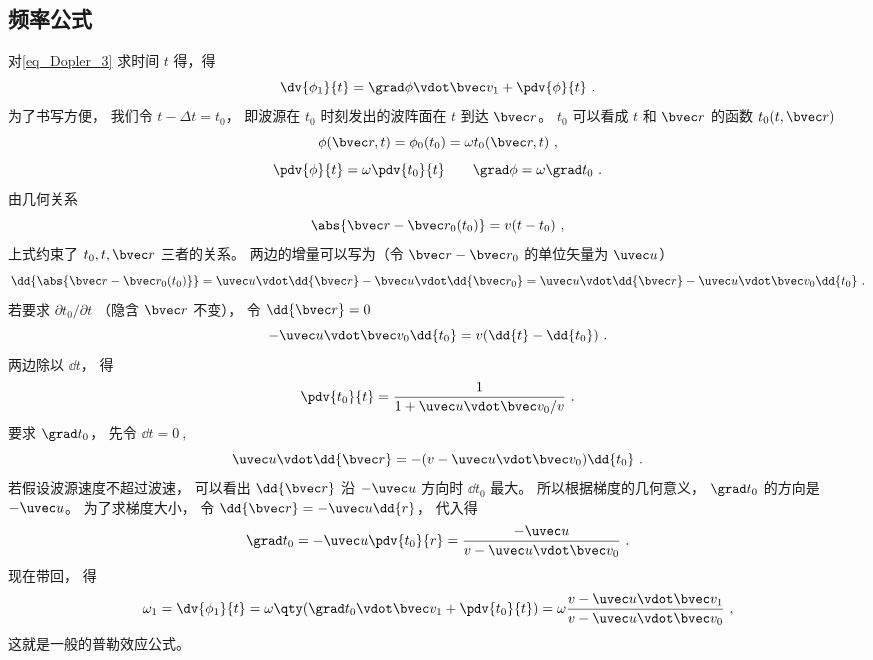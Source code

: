 \subsection{频率公式}
对\autoref{eq_Dopler_3} 求时间 $t$ 得，得
\begin{equation}
\dv{\phi_1}{t} = \grad\phi \vdot \bvec v_1 + \pdv{\phi}{t}~.
\end{equation}
为了书写方便， 我们令 $t - \Delta t = t_0$， 即波源在 $t_0$ 时刻发出的波阵面在 $t$ 到达 $\bvec r$。 $t_0$ 可以看成 $t$ 和 $\bvec r$ 的函数  $t_0(t, \bvec r)$
\begin{equation}
\phi(\bvec r, t) =  \phi_0(t_0) = \omega t_0(\bvec r, t)~,
\end{equation}
\begin{equation}
\pdv{\phi}{t} = \omega \pdv{t_0}{t} \qquad
\grad \phi = \omega \grad t_0~.
\end{equation}
由几何关系
\begin{equation}
\abs{\bvec r - \bvec r_0(t_0)} = v(t - t_0)~,
\end{equation}
上式约束了 $t_0, t, \bvec r$ 三者的关系。 两边的增量可以写为（令 $\bvec r - \bvec r_0$ 的单位矢量为 $\uvec u$）
\begin{equation}
\dd{\abs{\bvec r - \bvec r_0(t_0)}} = \uvec u \vdot \dd{\bvec r} - \bvec u \vdot \dd{\bvec r_0} = \uvec u \vdot \dd{\bvec r} - \uvec u \vdot \bvec v_0 \dd{t_0}~.
\end{equation}
若要求 $\partial t_0 / \partial t$ （隐含 $\bvec r$ 不变）， 令 $\dd{\bvec r} = 0$
\begin{equation}
-\uvec u \vdot \bvec v_0 \dd{t_0} = v(\dd{t} - \dd{t_0})~.
\end{equation}
两边除以 $\dd{t}$， 得
\begin{equation}
\pdv{t_0}{t} = \frac{1}{1 + \uvec u \vdot \bvec v_0/v}~.
\end{equation}
要求 $\grad t_0$， 先令 $\dd{t} = 0~,$
\begin{equation}
\uvec u \vdot \dd{\bvec r} = -(v - \uvec u \vdot \bvec v_0) \dd{t_0}~.
\end{equation}
若假设波源速度不超过波速， 可以看出 $\dd{\bvec r}$ 沿 $-\uvec u$ 方向时 $\dd{t_0}$ 最大。 所以根据梯度的几何意义， $\grad t_0$ 的方向是 $-\uvec u$。 为了求梯度大小， 令 $\dd{\bvec r} = -\uvec u \dd{r}$， 代入得
\begin{equation}
\grad t_0 = -\uvec u \pdv{t_0}{r} = \frac{ - \uvec u}{v - \uvec u \vdot \bvec v_0}~.
\end{equation}
现在带回， 得
\begin{equation}
\omega_1 = \dv{\phi_1}{t} = \omega\qty(\grad t_0 \vdot \bvec v_1 + \pdv{t_0}{t}) = \omega \frac{v - \uvec u \vdot \bvec v_1}{v - \uvec u \vdot \bvec v_0}~,
\end{equation}
这就是一般的普勒效应公式。
